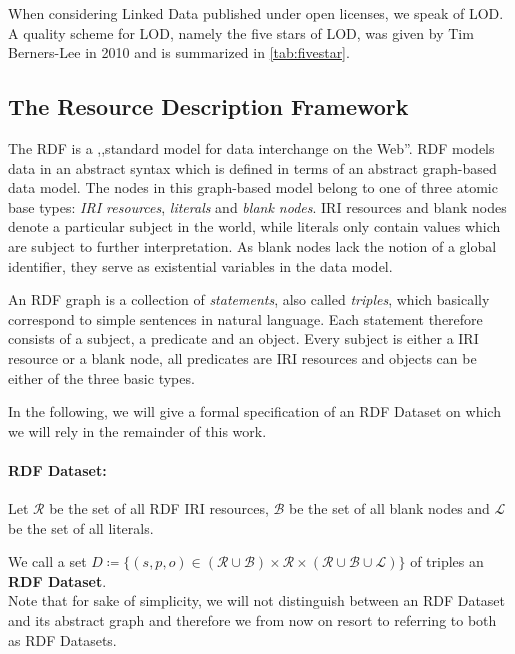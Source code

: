 When considering Linked Data published under open licenses, we speak of \acf{LOD}.
A quality scheme for \ac{LOD}, namely the five stars of \ac{LOD}, was given by Tim Berners-Lee in 2010\cite{berners-lee:2006a} and is summarized in \autoref{tab:fivestar}.


\subsection{The Resource Description Framework}
\label{ssec:rdf}

The \acf{RDF} is a ,,standard model for data interchange on the Web''\cite{group:2014a}.
\ac{RDF} models data in an abstract syntax which is defined in terms of an abstract graph-based data model.
The nodes in this graph-based model belong to one of three atomic base types: \emph{\acs{IRI} resources}, \emph{literals} and \emph{blank nodes}.
\acs{IRI} resources and blank nodes denote a particular subject in the world, while literals only contain values which are subject to further interpretation.
As blank nodes lack the notion of a global identifier, they serve as existential variables in the data model.

An \ac{RDF} graph is a collection of \emph{statements}, also called \emph{triples}, which basically correspond to simple sentences in natural language.
Each statement therefore consists of a subject, a predicate and an object.
Every subject is either a \acs{IRI} resource or a blank node, all predicates are \acs{IRI} resources and objects can be either of the three basic types.

In the following, we will give a formal specification of an \ac{RDF} Dataset on which we will rely in the remainder of this work.

\newpage
{}
\paragraph{RDF Dataset:} Let $\mathcal{R}$ be the set of all \ac{RDF} \ac{IRI} resources, $\mathcal{B}$ be the set of all blank nodes and $\mathcal{L}$ be the set of all literals.

We call a set $D\coloneq \{(s,p,o) \in (\mathcal{R}\cup\mathcal{B})\times\mathcal{R}\times(\mathcal{R}\cup\mathcal{B}\cup\mathcal{L})\} $ of triples an \textbf{\ac{RDF} Dataset}.\\

Note that for sake of simplicity, we will not distinguish between an \ac{RDF} Dataset and its abstract graph and therefore we from now on resort to referring to both as \ac{RDF} Datasets.\\

